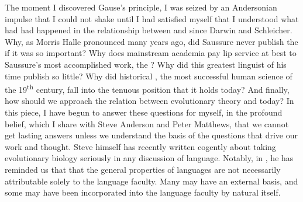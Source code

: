 \documentclass[output=paper,
modfonts
]{LSP/langsci}
\begin{document}
The moment I discovered Gause's principle, I was seized by an Andersonian impulse that I could not shake until I had satisfied myself that I understood what had had happened in the relationship between  and  since Darwin and Schleicher. Why, as Morris Halle pronounced many years ago, did Saussure never publish the  if it was so important?  Why does mainstream academia pay lip service at best to Saussure's most accomplished work, the ?  Why did this greatest linguist of his time publish so little? Why did historical , the most successful human science of the 19\textsuperscript{th} century, fall into the tenuous position that it holds today? And finally, how should we approach the relation between evolutionary theory and  today?  In this piece, I have begun to answer these questions for myself, in the profound belief, which I share with Steve Anderson and Peter Matthews, that we cannot get lasting answers unless we understand the basis of the questions that drive our work and thought. Steve himself has recently written cogently about taking evolutionary biology seriously in any discussion of language. Notably, in \citet{anderson2013}, he has reminded us that that the general properties of languages are not necessarily attributable solely to the language faculty.  Many may have an external basis, and some may have been incorporated into the language faculty by natural  itself.

{\sloppy
\printbibliography[heading=subbibliography,notkeyword=this]
}
\end{document}
